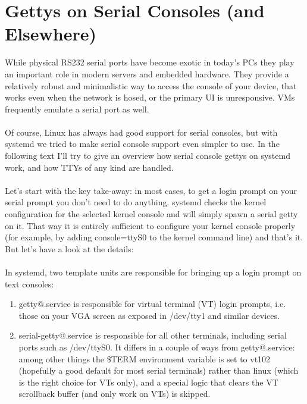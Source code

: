 \documentclass[titlepage]{article}
\begin{document}
\section{Gettys on Serial Consoles (and Elsewhere)}
While physical RS232 serial ports have become exotic in today's PCs they play an important role in modern servers and embedded hardware. They provide a relatively robust and minimalistic way to access the console of your device, that works even when the network is hosed, or the primary UI is unresponsive. VMs frequently emulate a serial port as well.
\\
\\
Of course, Linux has always had good support for serial consoles, but with systemd we tried to make serial console support even simpler to use. In the following text I'll try to give an overview how serial console gettys on systemd work, and how TTYs of any kind are handled.
\\
\\
Let's start with the key take-away: in most cases, to get a login prompt on your serial prompt you don't need to do anything. systemd checks the kernel configuration for the selected kernel console and will simply spawn a serial getty on it. That way it is entirely sufficient to configure your kernel console properly (for example, by adding console=ttyS0 to the kernel command line) and that's it. But let's have a look at the details:
\\
\\
In systemd, two template units are responsible for bringing up a login prompt on text consoles:
\begin{enumerate}
\item getty@.service is responsible for virtual terminal (VT) login prompts, i.e. those on your VGA screen as exposed in /dev/tty1 and similar devices.
\item serial-getty@.service is responsible for all other terminals, including serial ports such as /dev/ttyS0. It differs in a couple of ways from getty@.service: among other things the \$TERM environment variable is set to vt102 (hopefully a good default for most serial terminals) rather than linux (which is the right choice for VTs only), and a special logic that clears the VT scrollback buffer (and only work on VTs) is skipped.
\end{enumerate}
\end{document}
